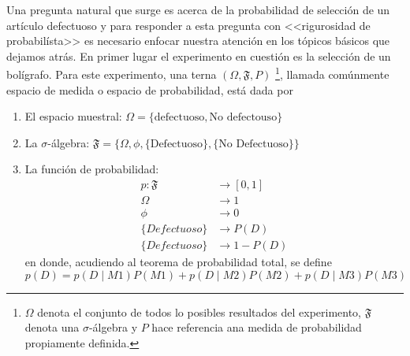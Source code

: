 \documentclass[10pt,openright]{book}\usepackage[]{graphicx}\usepackage[]{color}
\begin{document}
\begin{Eje}
Una pregunta natural que surge es acerca de la probabilidad de selección de un artículo defectuoso y para responder a esta pregunta con <<rigurosidad de probabilísta>> es necesario enfocar nuestra atención en los tópicos básicos que dejamos atrás. En primer lugar el experimento en cuestión es la selección de un bolígrafo. Para este experimento, una terna $(\Omega, \mathfrak{F}, P)$ \footnote{$\Omega$ denota el conjunto de todos lo posibles resultados del experimento, $\mathfrak{F}$ denota una $\sigma$-álgebra y $P$ hace referencia ana medida de probabilidad propiamente definida.}, llamada comúnmente espacio de medida o espacio de probabilidad, está dada por
\begin{enumerate}
  \item El espacio muestral: $\Omega=\{\text{defectuoso}, \text{No defectouso}\}$
  \item La $\sigma$-álgebra: $\mathfrak{F}=\{\Omega, \phi, \{\text{Defectuoso}\}, \{\text{No Defectuoso}\}\}$
  \item La función de probabilidad:
  \begin{align*}
  p: \mathfrak{F} &\longrightarrow [0,1]\\
     \Omega &\longrightarrow 1\\
     \phi &\longrightarrow 0\\
     \{Defectuoso\}&\longrightarrow P(D)\\
     \{Defectuoso\}&\longrightarrow 1-P(D)
  \end{align*}
  en donde, acudiendo al teorema de probabilidad total, se define
  \begin{equation*}
  p(D)=p(D \mid M1)P(M1)+p(D \mid M2)P(M2)+p(D \mid M3)P(M3)
  \end{equation*}
\end{enumerate}


\end{Eje}
\end{document}
